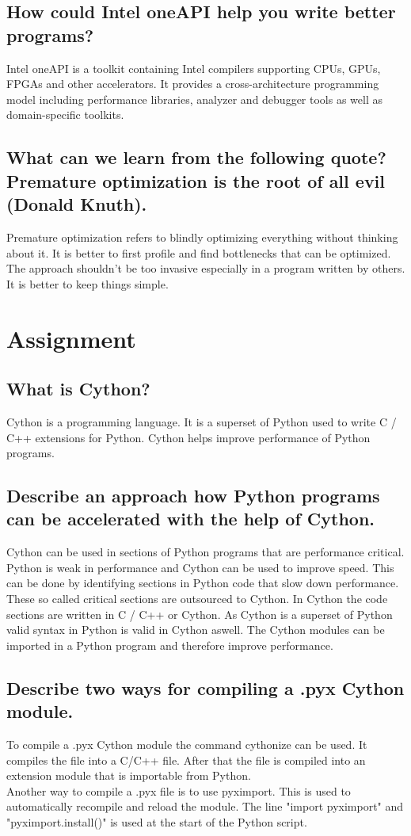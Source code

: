 \documentclass[runningheads]{llncs}
\begin{document}
\subsection{How could Intel oneAPI help you write better programs?}
Intel oneAPI is a toolkit containing Intel compilers supporting CPUs, GPUs, FPGAs and other accelerators.
It provides a cross-architecture programming model including performance libraries, analyzer and debugger tools as well as 
domain-specific toolkits.

\subsection{What can we learn from the following quote? Premature optimization is the root of all evil (Donald Knuth).}
Premature optimization refers to blindly optimizing everything without thinking about it.
It is better to first profile and find bottlenecks that can be optimized.
The approach shouldn't be too invasive especially in a program written by others.
It is better to keep things simple.

\section{Assignment}

\subsection{What is Cython?}
Cython is a programming language. 
It is a superset of Python used to write C / C++ extensions for Python.
Cython helps improve performance of Python programs.

\subsection{Describe an approach how Python programs can be accelerated with the help of Cython.}
Cython can be used in sections of Python programs that are performance critical.
Python is weak in performance and Cython can be used to improve speed. 
This can be done by identifying sections in Python code that slow down performance.
These so called critical sections are outsourced to Cython. 
In Cython the code sections are written in C / C++ or Cython.
As Cython is a superset of Python valid syntax in Python is valid in Cython aswell.
The Cython modules can be imported in a Python program and therefore improve performance.

\subsection{Describe two ways for compiling a .pyx Cython module.}
To compile a .pyx Cython module the command cythonize can be used. 
It compiles the file into a C/C++ file.
After that the file is compiled into an extension module that is importable from Python.
\\
Another way to compile a .pyx file is to use pyximport. 
This is used to automatically recompile and reload the module.
The line "import pyximport" and "pyximport.install()" is used at the start of the Python script.
\end{document}
